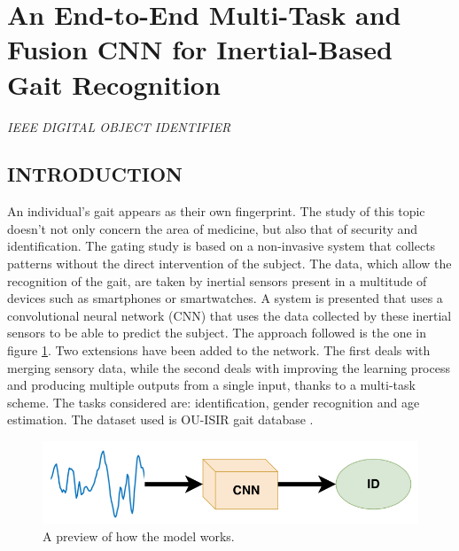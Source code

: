 \section{An End-to-End Multi-Task and Fusion CNN for Inertial-Based Gait Recognition}

\begin{flushleft}
    \author{
    Rubén Delgrado-Esca$ \tilde{n} $o,
    Francisco M. Castro,
    Julián Ramos Cózar,
    Manuel J. Marín-Jiménez,
    and Nicolás Guil
    }
\end{flushleft}

\begin{center}
    \emph{IEEE DIGITAL OBJECT IDENTIFIER}
\end{center}

\subsection{INTRODUCTION}
An individual's gait appears as their own fingerprint. The study of this 
topic doesn't not only concern the area of medicine, but also that of security 
and identification. The gating study is based on a non-invasive system that 
collects patterns without the direct intervention of the subject. The data, 
which allow the recognition of the gait, are taken by inertial sensors present 
in a multitude of devices such as smartphones or smartwatches. A system 
is presented that uses a convolutional neural network (CNN) that uses the 
data collected by these inertial sensors to be able to predict the subject. The 
approach followed is the one in figure \ref{fig:preview}. Two extensions have been added 
to the network. The first deals with merging sensory data, while the second 
deals with improving the learning process and producing multiple outputs 
from a single input, thanks to a multi-task scheme. The tasks considered 
are: identification, gender recognition and age estimation. The dataset used 
is OU-ISIR gait database \cite{0857651721}.
\begin{figure}[htbp]
    \centering
    \includegraphics[width = 0.6 \linewidth]{images/paper5/usecase.png}
    \centering
    \caption{A preview of how the model works.}
    \label{fig:preview}
\end{figure}

